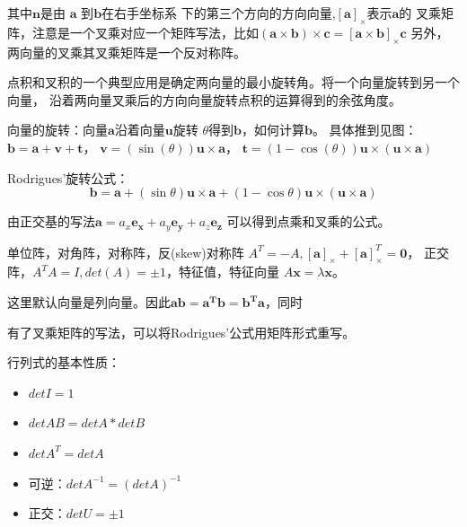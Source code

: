 \documentclass[lang=cn,newtx,10pt,scheme=chinese]{elegantbook}
\begin{document}
其中\(\boldsymbol{n}\)是由 $\boldsymbol{a}$ 到$\boldsymbol{b}$在右手坐标系
下的第三个方向的方向向量,$[\boldsymbol{a}]_{\times}$表示$\boldsymbol{a}$的
叉乘矩阵，注意是一个叉乘对应一个矩阵写法，比如$(\boldsymbol{a} \times \boldsymbol{b}) \times \boldsymbol{c}=[\boldsymbol{a} \times \boldsymbol{b}]_{\times} \boldsymbol{c}$
另外，两向量的叉乘其叉乘矩阵是一个反对称阵。

点积和叉积的一个典型应用是确定两向量的最小旋转角。将一个向量旋转到另一个向量，
沿着两向量叉乘后的方向向量旋转点积的运算得到的余弦角度。

向量的旋转：向量$\boldsymbol{a}$沿着向量$\boldsymbol{u}$旋转
$\theta$得到$\boldsymbol{b}$，如何计算$\boldsymbol{b}$。
具体推到见图：$\boldsymbol{b} = \boldsymbol{a} + \boldsymbol{v} + \boldsymbol{t}$，
$\boldsymbol{v} = (\sin(\theta))\boldsymbol{u} \times \boldsymbol{a}$，
$\boldsymbol{t} = (1 - \cos(\theta))\boldsymbol{u} \times (\boldsymbol{u} \times \boldsymbol{a})$

  
Rodrigues'旋转公式：
\begin{equation}
  \boldsymbol{b}= \boldsymbol{a}+(\sin \theta) \boldsymbol{u} \times \boldsymbol{a}+(1-\cos \theta) \boldsymbol{u} \times(\boldsymbol{u} \times \boldsymbol{a})
\end{equation}

由正交基的写法$\boldsymbol{a} = a_x \boldsymbol{e_x} + 
                  a_y \boldsymbol{e_y} +
                  a_z \boldsymbol{e_z}$
可以得到点乘和叉乘的公式。

单位阵，对角阵，对称阵，反(skew)对称阵 $A^T = -A,[\boldsymbol{a}]_{\times}+[\boldsymbol{a}]^{T}_{\times}=\boldsymbol{0} $，
正交阵，$A^{T}A=I, det(A)=\pm 1$，特征值，特征向量 $A\boldsymbol{x}=\lambda\boldsymbol{x}$。

这里默认向量是列向量。因此$\boldsymbol{a}\boldsymbol{b}=\boldsymbol{a^T b}=
\boldsymbol{b^{T}a}$，同时

有了叉乘矩阵的写法，可以将Rodrigues'公式用矩阵形式重写。

行列式的基本性质：
\begin{itemize}
  \setlength{\itemindent}{2em}
  \item $det I = 1$
  \item $det AB = det A * det B $
  \item $det A^T = det A$
  \item 可逆：$det A^{-1} = (det A)^{-1}$
  \item 正交：$det U = \pm 1$
\end{itemize}
\end{document}
